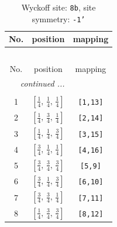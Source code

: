 \documentclass[fleqn,8pt]{jsarticle}
\begin{document}
\begin{longtable}{ccc}
\caption{Wyckoff site: {\tt 8b}, site symmetry: {\tt -1'}}
 \\
 \hline \hline
No. & position & mapping \\ \hline \endfirsthead

\multicolumn{2}{l}{\tablename\ \thetable{}} \\
 \hline \hline
No. & position & mapping \\ \hline \endhead

 \hline \hline
\multicolumn{2}{r}{\footnotesize\it continued ...} \\ \endfoot

 \hline \hline
\multicolumn{2}{r}{} \\ \endlastfoot

1 & $\left[ \frac{1}{4},\, \frac{1}{4},\, \frac{1}{4} \right]$ & {\tt [1,13]} \\ \hline
2 & $\left[ \frac{1}{4},\, \frac{3}{4},\, \frac{1}{4} \right]$ & {\tt [2,14]} \\ \hline
3 & $\left[ \frac{1}{4},\, \frac{1}{4},\, \frac{3}{4} \right]$ & {\tt [3,15]} \\ \hline
4 & $\left[ \frac{3}{4},\, \frac{1}{4},\, \frac{1}{4} \right]$ & {\tt [4,16]} \\ \hline
5 & $\left[ \frac{3}{4},\, \frac{3}{4},\, \frac{3}{4} \right]$ & {\tt [5,9]} \\ \hline
6 & $\left[ \frac{3}{4},\, \frac{1}{4},\, \frac{3}{4} \right]$ & {\tt [6,10]} \\ \hline
7 & $\left[ \frac{3}{4},\, \frac{3}{4},\, \frac{1}{4} \right]$ & {\tt [7,11]} \\ \hline
8 & $\left[ \frac{1}{4},\, \frac{3}{4},\, \frac{3}{4} \right]$ & {\tt [8,12]} \\
\end{longtable}
\renewcommand{\arraystretch}{1.2}
\end{document}
